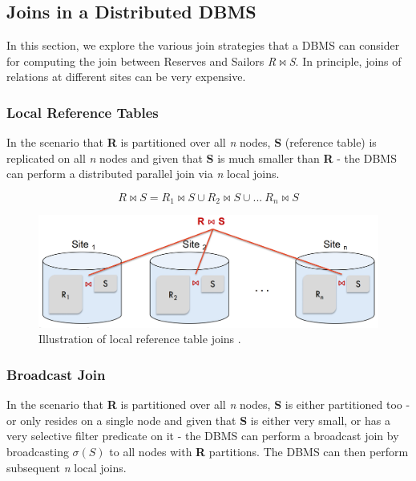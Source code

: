 \subsection{Joins in a Distributed DBMS}
In this section, we explore the various join strategies that a DBMS can consider for computing the join between Reserves and Sailors \textit{R$\Join$S}. In principle, joins of relations at different sites can be very expensive.

\subsubsection{Local Reference Tables}
In the scenario that \textbf{R} is partitioned over all \textit{n} nodes, \textbf{S} (reference table) is replicated on all \textit{n} nodes and given that \textbf{S} is much smaller than \textbf{R} - the DBMS can perform a distributed parallel join via \textit{n} local joins.

\begin{equation}
R \Join S = R_1 \Join S \cup R_2 \Join S \cup ...\ R_n \Join S
\end{equation}

\begin{figure}[ht]
  \centering
  \includegraphics[width=\linewidth]{figures/local-reference-join.png}
  \caption{Illustration of local reference table joins \cite{DATA3404Slides}.}
  \label{fig:local-reference-join}
\end{figure}

\subsubsection{Broadcast Join}
In the scenario that \textbf{R} is partitioned over all \textit{n} nodes, \textbf{S} is either partitioned too - or only resides on a single node and given that \textbf{S} is either very small, or has a very selective filter predicate on it - the DBMS can perform a broadcast join by broadcasting $\sigma(S)$ to all nodes with \textbf{R} partitions. The DBMS can then perform subsequent \textit{n} local joins.

